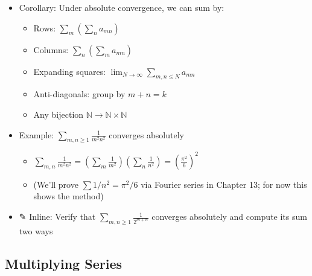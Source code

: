 \documentclass[
  10pt,
  letterpaper,
]{scrbook}
\providecommand{\tightlist}{%
  \setlength{\itemsep}{0pt}\setlength{\parskip}{0pt}}
\begin{document}
\begin{itemize}
\begin{itemize}
    \begin{itemize}
    \tightlist
    \item
      Same argument as §5.1: absolute convergence allows rearrangement
    \item
      Any bijection
      \(\sigma: \mathbb{N} \to \mathbb{N} \times \mathbb{N}\) gives
      \(\sum_{k=1}^{\infty} a_{\sigma(k)} = S\)
    \end{itemize}
  \end{itemize}
\item
  Corollary: Under absolute convergence, we can sum by:

  \begin{itemize}
  \tightlist
  \item
    Rows: \(\sum_m (\sum_n a_{mn})\)
  \item
    Columns: \(\sum_n (\sum_m a_{mn})\)
  \item
    Expanding squares: \(\lim_{N \to \infty} \sum_{m,n \leq N} a_{mn}\)
  \item
    Anti-diagonals: group by \(m + n = k\)
  \item
    Any bijection \(\mathbb{N} \to \mathbb{N} \times \mathbb{N}\)
  \end{itemize}
\item
  Example: \(\sum_{m,n \geq 1} \frac{1}{m^2 n^2}\) converges absolutely

  \begin{itemize}
  \tightlist
  \item
    \(\sum_{m,n} \frac{1}{m^2 n^2} = \left(\sum_m \frac{1}{m^2}\right)\left(\sum_n \frac{1}{n^2}\right) = \left(\frac{\pi^2}{6}\right)^2\)
  \item
    (We'll prove \(\sum 1/n^2 = \pi^2/6\) via Fourier series in Chapter
    13; for now this shows the method)
  \end{itemize}
\item
  ✎ Inline: Verify that \(\sum_{m,n \geq 1} \frac{1}{2^{m+n}}\)
  converges absolutely and compute its sum two ways
\end{itemize}

\subsection{Multiplying Series}\label{multiplying-series}
\end{document}
